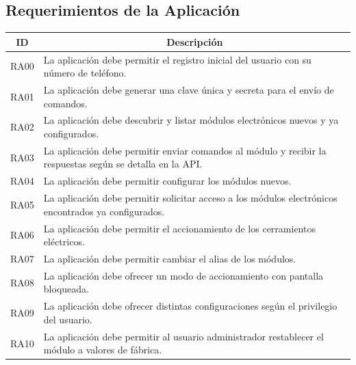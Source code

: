 \subsection{Requerimientos de la Aplicación}

\begin{table}[ht]
		\begin{tabular}{|l|m{12cm}|}
			\hline
			\multicolumn{1}{|c|}{\textbf{ID}} & \multicolumn{1}{c|}{\textbf{Descripción}}                                                                 \\ \hline
			RA00                              & La aplicación debe permitir el registro inicial del usuario con su número de teléfono.                    \\ \hline
			RA01                              & La aplicación debe generar una clave única y secreta para el envío de comandos.                           \\ \hline
			RA02                              & La aplicación debe descubrir y listar módulos electrónicos nuevos y ya configurados.                      \\ \hline
			RA03                              & La aplicación debe permitir enviar comandos al módulo y recibir la respuestas según se detalla en la API. \\ \hline
			RA04                              & La aplicación debe permitir configurar los módulos nuevos.                                                \\ \hline
			RA05                              & La aplicación debe permitir solicitar acceso a los módulos electrónicos encontrados ya configurados.      \\ \hline
			RA06                              & La aplicación debe permitir el accionamiento de los cerramientos eléctricos.                              \\ \hline
			RA07                              & La aplicación debe permitir cambiar el alias de los módulos.                                              \\ \hline
			RA08                              & La aplicación debe ofrecer un modo de accionamiento con pantalla bloqueada.                               \\ \hline
			RA09                              & La aplicación debe ofrecer distintas configuraciones según el privilegio del usuario.                     \\ \hline
			RA10                              & La aplicación debe permitir al usuario administrador restablecer el módulo a valores de fábrica.          \\ \hline

\end{tabular}
\end{table}
